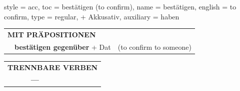 \begin{verbentry}{
  style = {acc},
  toc = {bestätigen (to confirm)},
  name = {bestätigen},
  english = {to confirm},
  type = {regular, + Akkusativ},
  auxiliary = {haben}
}
\vspace{10pt}

\begin{tabular}{lll}
\multicolumn{3}{l}{\textbf{MIT PRÄPOSITIONEN}}\\
& \textbf{bestätigen gegenüber} + Dat & (to confirm to someone)\\
\end{tabular}
\hfill
\begin{tabular}{lll}
\multicolumn{3}{l}{\textbf{TRENNBARE VERBEN}}\\
& \textbf{---} & \\
\end{tabular}

\vspace{-5pt}
\end{verbentry}

